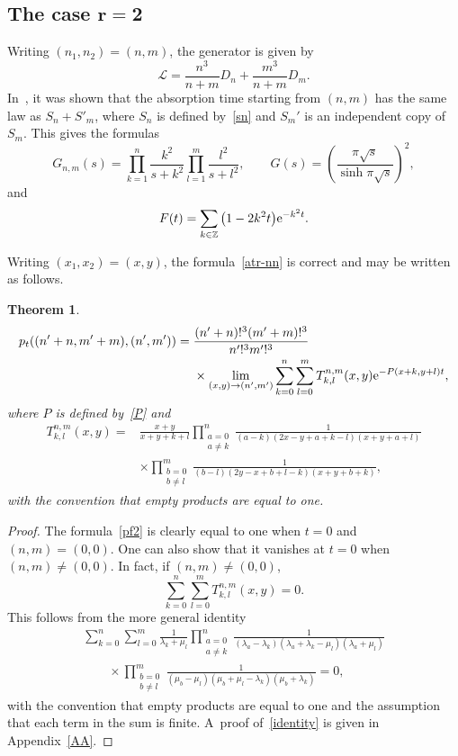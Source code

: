 \documentclass[pdftex]{sigma}
\newtheorem{thm}{Theorem}[section]
\theoremstyle{definition}
\newcommand\Z{{\mathbb Z}}
\newcommand\cL{{\mathcal L}}
\begin{document}
\subsection[The case r=2]{The case $\boldsymbol{r=2}$}

Writing $(n_1,n_2)=(n,m)$, the generator is given by
\[\cL = \frac{n^3}{n+m} D_n + \frac{m^3}{n+m} D_m.\]
In~\cite[Proposition 4.4]{noc23}, it was shown that the absorption time starting from $(n,m)$ has the same law as
$S_n+S'_m$, where $S_n$ is defined by~\eqref{sn} and $S_m'$ is an independent copy of $S_m$.
This gives the formulas
\[G_{n,m}(s) = \prod_{k=1}^n \frac{k^2}{s+k^2} \prod_{l=1}^m \frac{l^2}{s+l^2},\qquad
G(s) = \left(\frac{\pi\sqrt{s}}{\sinh \pi\sqrt{s}}\right)^2,\]
and
\begin{equation}\label{at2}
F(t)= \sum_{k\in\Z} \big(1-2k^2t\big) {\rm e}^{-k^2 t}.
\end{equation}

Writing $(x_1,x_2)=(x,y)$, the formula~\eqref{atr-nn} is correct and may be written as follows.

\begin{thm}
\begin{align}
p_t((n'+n,m'+m),(n',m')) ={} &
\frac{(n'+n)!^3 (m'+m)!^3 }{n'!^3 m'!^3} \nonumber \\
&\times \lim_{(x,y)\to (n',m')} \sum_{k=0}^n \sum_{l=0}^m
T^{n,m}_{k,l}(x,y) {\rm e}^{-P(x+k,y+l)t},\label{pf2}
\end{align}
where $P$ is defined by~\eqref{P} and
\begin{align*}
T^{n,m}_{k,l}(x,y)={}
& \frac{x+y}{x+y+k+l} \prod_{\substack{a=0\\ a\ne k}}^{n} \frac{1}{(a-k)(2x-y+a+k-l)(x+y+a+l)} \\
&\times \prod_{\substack{b=0\\ b\ne l}}^{m} \frac1{(b-l)(2y-x+b+l-k)(x+y+b+k)},
\end{align*}
with the convention that empty products are equal to one.
\end{thm}
\begin{proof}
The formula~\eqref{pf2} is clearly equal to one when $t=0$ and $(n,m)= (0,0)$.
One can also show that it vanishes at $t=0$ when $(n,m)\ne (0,0)$.
In fact, if $(n,m)\ne (0,0)$,
\[\sum_{k=0}^n \sum_{l=0}^m T^{n,m}_{k,l}(x,y) =0.\]
This follows from the more general identity
\begin{gather}
\sum_{k=0}^n \sum_{l=0}^m
\frac1{\lambda_k+\mu_l}
 \prod_{\substack{a=0\\ a\ne k}}^{n} \frac{1}{(\lambda_a-\lambda_k)(\lambda_a+\lambda_k-\mu_l)(\lambda_a+\mu_l)} \nonumber \\
\qquad \times \prod_{\substack{b=0\\ b\ne l}}^{m} \frac1{(\mu_b-\mu_l)(\mu_b+\mu_l-\lambda_k)(\mu_b+\lambda_k)} =0,\label{identity}
\end{gather}
with the convention that empty products are equal to one and the assumption that
each term in the sum is finite. A~proof of~\eqref{identity} is given in Appendix~\ref{AA}.
\end{proof}
\end{document}

